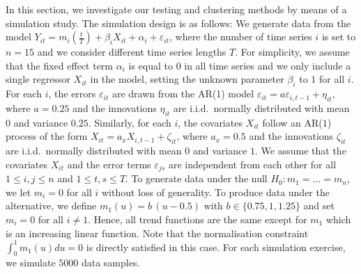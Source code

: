 \documentclass[a4paper,12pt]{article}
\begin{document}
In this section, we investigate our testing and clustering methods by means of a simulation study. The simulation design is as follows: We generate data from the model $Y_{it} = m_i(\frac{t}{T}) + \beta_i X_{it} +  \alpha_i  + \varepsilon_{it}$, where the number of time series $i$ is set to $n = 15$ and we consider different time series lengths $T$. For simplicity, we assume that the fixed effect term $\alpha_i$ is equal to $0$ in all time series and we only include a single regressor $X_{it}$ in the model, setting the unknown parameter $\beta_i$ to $1$ for all $i$. 
For each $i$, the errors $\varepsilon_{it}$ are drawn from the AR(1) model $\varepsilon_{it} = a \varepsilon_{i, t-1} + \eta_{it}$, where $a = 0.25$ and the innovations $\eta_{it}$ are i.i.d.\ normally distributed with mean $0$ and variance $0.25$. Similarly, for each $i$, the covariates $X_{it}$ follow an AR($1$) process of the form $X_{it} = a_x X_{i, t-1} + \zeta_{it}$, where $a_x = 0.5$ and the innovations $\zeta_{it}$ are i.i.d.\ normally distributed with mean $0$ and variance $1$. We assume that the covariates $X_{it}$ and the error terms $\varepsilon_{js}$ are independent from each other for all $1 \leq i,j \leq n$ and $1 \leq t, s \leq T$. 
To generate data under the null $H_0: m_1 = \ldots = m_n$, we let $m_i = 0$ for all $i$ without loss of generality. To produce data under the alternative, we define $m_1(u) = b \, (u - 0.5) $ with $b \in \{ 0.75, 1, 1.25 \}$ and set $m_i = 0$ for all $i \ne 1$. Hence, all trend functions are the same except for $m_1$ which is an increasing linear function. Note that the normalisation constraint $\int_0^1 m_1(u) du = 0$ is directly satisfied in this case. For each simulation exercise, we simulate $5000$ data samples. 
\end{document}

